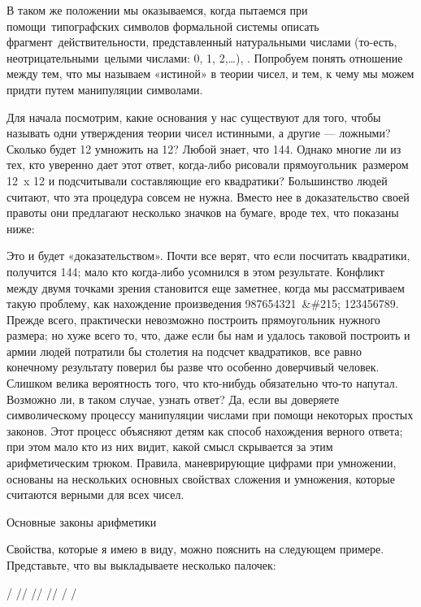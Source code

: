 В таком же положении мы оказываемся, когда пытаемся при помощи~типографских символов формальной системы описать фрагмент~действительности, представленный натуральными числами (то-есть, неотрицательными~целыми числами: 0, 1, 2,\ldots), . Попробуем понять отношение между тем, что мы называем «истиной» в теории чисел, и тем, к чему мы можем придти путем манипуляции символами.

Для начала посмотрим, какие основания у нас существуют для того, чтобы называть одни утверждения теории чисел истинными, а другие --- ложными? Сколько будет 12 умножить на 12? Любой знает, что 144. Однако многие ли из тех, кто уверенно дает этот ответ, когда-либо рисовали прямоугольник~размером 12~x 12 и подсчитывали составляющие его квадратики? Большинство людей считают, что эта процедура совсем не нужна. Вместо нее в доказательство своей правоты они предлагают несколько значков на бумаге, вроде тех, что показаны ниже:

Это и будет «доказательством». Почти все верят, что если посчитать квадратики, получится 144; мало кто когда-либо усомнился в этом результате. Конфликт между двумя точками зрения становится еще заметнее, когда мы рассматриваем такую проблему, как нахождение произведения 987654321~\&\#215; 123456789. Прежде всего, практически невозможно построить прямоугольник нужного размера; но хуже всего то, что, даже если бы нам и удалось таковой построить и армии людей потратили бы столетия на подсчет квадратиков, все равно конечному результату поверил бы разве что особенно доверчивый человек. Слишком велика вероятность того, что кто-нибудь обязательно что-то напутал. Возможно ли, в таком случае, узнать ответ? Да, если вы доверяете символическому процессу манипуляции числами при помощи некоторых простых законов. Этот процесс объясняют детям как способ нахождения верного ответа; при этом мало кто из них видит, какой смысл скрывается за этим арифметическим трюком. Правила, маневрирующие цифрами при умножении, основаны на нескольких основных свойствах сложения и умножения, которые считаются верными для всех чисел.

Основные законы арифметики

Свойства, которые я имею в виду, можно пояснить на следующем примере. Представьте, что вы выкладываете несколько палочек:

/ // // // / /

